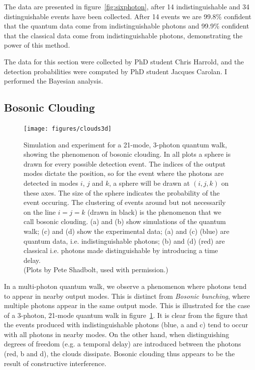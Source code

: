 The data are presented in figure~\ref{fig:sixphoton}, after 14 indistinguishable
and 34 distinguishable events have been collected. After 14 events we are 99.8\%
confident that the quantum data come from indistinguishable photons and 99.9\%
confident that the classical data come from indistinguishable photons,
demonstrating the power of this method.

The data
for this section were collected by PhD student Chris Harrold, and the detection
probabilities were computed by PhD student Jacques Carolan. I performed the
Bayesian analysis.

\subsection{Bosonic Clouding}
\label{sec:Clouding}
\begin{figure}[p]
  \centering
  \texttt{[image: figures/clouds3d]}
  \caption[Bosonic clouding in a quantum walk]
  {Simulation and experiment for a 21-mode, 3-photon quantum walk, showing the
  phenomenon of bosonic clouding. In all plots a sphere is drawn for every
  possible detection event. The indices of the output modes dictate the
  position, so for the event where the photons are detected in modes \(i\),
  \(j\) and \(k\), a sphere will be drawn at \(\left(i,j,k\right)\) on these
  axes. The size of the sphere indicates the probability of the event occuring. 
  The clustering of events around but not necessarily on the line \(i=j=k\)
  (drawn in black) is the phenomenon that we call bosonic clouding.
  (a) and (b) show simulations of the quantum walk; (c) and (d) show the
  experimental data; (a) and (c) (blue) are quantum data, i.e. indistinguishable
  photons; (b) and (d) (red) are classical i.e. photons made distinguishable by
  introducing a time delay.\\
  (Plots by Pete Shadbolt, used with permission.)}
  \label{fig:clouds3d}
\end{figure}
In a multi-photon quantum walk, we observe a phenomenon where photons tend to
appear in nearby output modes. This is distinct from \emph{Bosonic bunching},
where multiple photons appear in the same output mode. This is illustrated for
the case of a 3-photon, 21-mode quantum walk in figure~\ref{fig:clouds3d}. It
is clear from the figure that the events produced with indistinguishable photons
(blue, a and c) tend to occur with all photons in nearby modes. On the other
hand, when distinguishing degrees of freedom (e.g. a temporal delay) are
introduced between the photons (red, b and d), the clouds dissipate. Bosonic
clouding thus appears to be the result of constructive interference.

